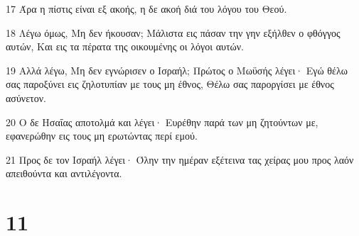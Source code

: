\par 17 Άρα η πίστις είναι εξ ακοής, η δε ακοή διά του λόγου του Θεού.
\par 18 Λέγω όμως, Μη δεν ήκουσαν; Μάλιστα εις πάσαν την γην εξήλθεν ο φθόγγος αυτών, Και εις τα πέρατα της οικουμένης οι λόγοι αυτών.
\par 19 Αλλά λέγω, Μη δεν εγνώρισεν ο Ισραήλ; Πρώτος ο Μωϋσής λέγει· Εγώ θέλω σας παροξύνει εις ζηλοτυπίαν με τους μη έθνος, Θέλω σας παροργίσει με έθνος ασύνετον.
\par 20 Ο δε Ησαΐας αποτολμά και λέγει· Ευρέθην παρά των μη ζητούντων με, εφανερώθην εις τους μη ερωτώντας περί εμού.
\par 21 Προς δε τον Ισραήλ λέγει· Όλην την ημέραν εξέτεινα τας χείρας μου προς λαόν απειθούντα και αντιλέγοντα.

\chapter{11}

